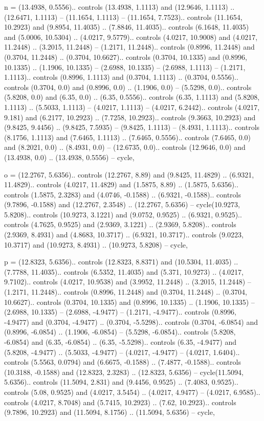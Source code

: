 n = {(13.4938, 0.5556).. controls (13.4938, 1.1113) and (12.9646, 1.1113) .. (12.6471, 1.1113) -- (11.1654, 1.1113) -- (11.1654, 7.7523).. controls (11.1654, 10.2923) and (9.8954, 11.4035) .. (7.8846, 11.4035).. controls (6.1648, 11.4035) and (5.0006, 10.5304) .. (4.0217, 9.5779).. controls (4.0217, 10.9008) and (4.0217, 11.2448) .. (3.2015, 11.2448) -- (1.2171, 11.2448).. controls (0.8996, 11.2448) and (0.3704, 11.2448) .. (0.3704, 10.6627).. controls (0.3704, 10.1335) and (0.8996, 10.1335) .. (1.1906, 10.1335) -- (2.6988, 10.1335) -- (2.6988, 1.1113) -- (1.2171, 1.1113).. controls (0.8996, 1.1113) and (0.3704, 1.1113) .. (0.3704, 0.5556).. controls (0.3704, 0.0) and (0.8996, 0.0) .. (1.1906, 0.0) -- (5.5298, 0.0).. controls (5.8208, 0.0) and (6.35, 0.0) .. (6.35, 0.5556).. controls (6.35, 1.1113) and (5.8208, 1.1113) .. (5.5033, 1.1113) -- (4.0217, 1.1113) -- (4.0217, 6.2442).. controls (4.0217, 9.181) and (6.2177, 10.2923) .. (7.7258, 10.2923).. controls (9.3663, 10.2923) and (9.8425, 9.4456) .. (9.8425, 7.5935) -- (9.8425, 1.1113) -- (8.4931, 1.1113).. controls (8.1756, 1.1113) and (7.6465, 1.1113) .. (7.6465, 0.5556).. controls (7.6465, 0.0) and (8.2021, 0.0) .. (8.4931, 0.0) -- (12.6735, 0.0).. controls (12.9646, 0.0) and (13.4938, 0.0) .. (13.4938, 0.5556) -- cycle},

o = {(12.2767, 5.6356).. controls (12.2767, 8.89) and (9.8425, 11.4829) .. (6.9321, 11.4829).. controls (4.0217, 11.4829) and (1.5875, 8.89) .. (1.5875, 5.6356).. controls (1.5875, 2.3283) and (4.0746, -0.1588) .. (6.9321, -0.1588).. controls (9.7896, -0.1588) and (12.2767, 2.3548) .. (12.2767, 5.6356) -- cycle(10.9273, 5.8208).. controls (10.9273, 3.1221) and (9.0752, 0.9525) .. (6.9321, 0.9525).. controls (4.7625, 0.9525) and (2.9369, 3.1221) .. (2.9369, 5.8208).. controls (2.9369, 8.4931) and (4.8683, 10.3717) .. (6.9321, 10.3717).. controls (9.0223, 10.3717) and (10.9273, 8.4931) .. (10.9273, 5.8208) -- cycle},

p = {(12.8323, 5.6356).. controls (12.8323, 8.8371) and (10.5304, 11.4035) .. (7.7788, 11.4035).. controls (6.5352, 11.4035) and (5.371, 10.9273) .. (4.0217, 9.7102).. controls (4.0217, 10.9538) and (3.9952, 11.2448) .. (3.2015, 11.2448) -- (1.2171, 11.2448).. controls (0.8996, 11.2448) and (0.3704, 11.2448) .. (0.3704, 10.6627).. controls (0.3704, 10.1335) and (0.8996, 10.1335) .. (1.1906, 10.1335) -- (2.6988, 10.1335) -- (2.6988, -4.9477) -- (1.2171, -4.9477).. controls (0.8996, -4.9477) and (0.3704, -4.9477) .. (0.3704, -5.5298).. controls (0.3704, -6.0854) and (0.8996, -6.0854) .. (1.1906, -6.0854) -- (5.5298, -6.0854).. controls (5.8208, -6.0854) and (6.35, -6.0854) .. (6.35, -5.5298).. controls (6.35, -4.9477) and (5.8208, -4.9477) .. (5.5033, -4.9477) -- (4.0217, -4.9477) -- (4.0217, 1.6404).. controls (5.5563, 0.0794) and (6.6675, -0.1588) .. (7.4877, -0.1588).. controls (10.3188, -0.1588) and (12.8323, 2.3283) .. (12.8323, 5.6356) -- cycle(11.5094, 5.6356).. controls (11.5094, 2.831) and (9.4456, 0.9525) .. (7.4083, 0.9525).. controls (5.08, 0.9525) and (4.0217, 3.5454) .. (4.0217, 4.9477) -- (4.0217, 6.9585).. controls (4.0217, 8.7048) and (5.7415, 10.2923) .. (7.62, 10.2923).. controls (9.7896, 10.2923) and (11.5094, 8.1756) .. (11.5094, 5.6356) -- cycle},


